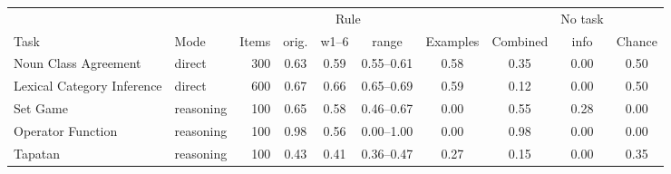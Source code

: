 \begin{tabular}{@{}llrccccccc@{}}
\toprule
 & & & \multicolumn{3}{c}{Rule} & & & No task & \\
\cmidrule(lr){4-6}
Task & Mode & Items & orig. & w1--6 & range & Examples & Combined & info & Chance \\
\midrule
Noun Class Agreement & direct & 300 & 0.63 & 0.59 & 0.55--0.61 & 0.58 & 0.35 & 0.00 & 0.50 \\
Lexical Category Inference & direct & 600 & 0.67 & 0.66 & 0.65--0.69 & 0.59 & 0.12 & 0.00 & 0.50 \\
Set Game & reasoning & 100 & 0.65 & 0.58 & 0.46--0.67 & 0.00 & 0.55 & 0.28 & 0.00 \\
Operator Function & reasoning & 100 & 0.98 & 0.56 & 0.00--1.00 & 0.00 & 0.98 & 0.00 & 0.00 \\
Tapatan & reasoning & 100 & 0.43 & 0.41 & 0.36--0.47 & 0.27 & 0.15 & 0.00 & 0.35 \\
\bottomrule
\end{tabular}
